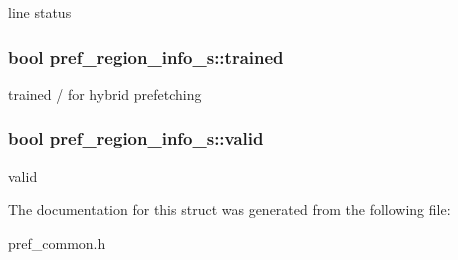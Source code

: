\label{structpref__region__info__s_ab3d02274c3da7cee73baf6d9b453ca89}
line status \hypertarget{structpref__region__info__s_a64ae1850a186f1cabe54fb98a14716d0}{
\subsubsection[{trained}]{\setlength{\rightskip}{0pt plus 5cm}bool {\bf pref\_\-region\_\-info\_\-s::trained}}}
\label{structpref__region__info__s_a64ae1850a186f1cabe54fb98a14716d0}
trained / for hybrid prefetching \hypertarget{structpref__region__info__s_af5c8211c6d31be803eeab677457cb6df}{
\subsubsection[{valid}]{\setlength{\rightskip}{0pt plus 5cm}bool {\bf pref\_\-region\_\-info\_\-s::valid}}}
\label{structpref__region__info__s_af5c8211c6d31be803eeab677457cb6df}
valid 

The documentation for this struct was generated from the following file:\begin{DoxyCompactItemize}
\item 
pref\_\-common.h\end{DoxyCompactItemize}
